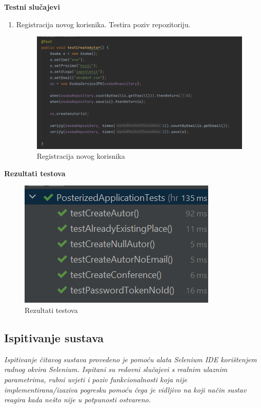 			\textbf{Testni slučajevi}
			\begin{enumerate}
				\item Registracija novog korisnika. Testira poziv repozitoriju.
				\begin{figure}[H]
					\includegraphics[scale=0.30]{slike/deploy/backTest1.png}
					\centering
					\caption{Registracija novog korisnika}
					\label{fig:backTest1}
				\end{figure}
			\end{enumerate}
			
			\textbf{Rezultati testova}
			\begin{figure}[H]
				\includegraphics[scale=0.30]{slike/deploy/backTestResults.png}
				\centering
				\caption{Rezultati testova}
				\label{fig:backTestResults}
			\end{figure}
			
			
			\subsection{Ispitivanje sustava}
			
			\textit{Ispitivanje čitavog sustava provedeno je pomoću alata Selenium IDE korištenjem radnog okvira Selenium. Ispitani su redovni slučajevi s realnim ulaznim parametrima, rubni uvjeti i poziv funkcionalnosti koja nije implementirana/izaziva pogresku pomoću čega je vidljivo na koji način sustav reagira kada nešto nije u potpunosti ostvareno.}
			
